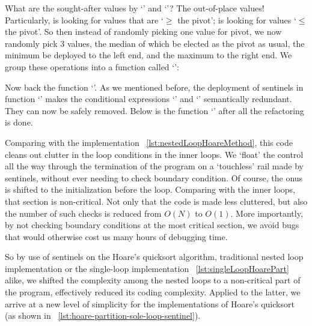 What are the sought-after values by `' and `'?
The out-of-place values!
Particularly,  is looking for values that are `$\geq$ the pivot';
 is looking for values `$\leq$ the pivot'.
So then instead of randomly picking one value for pivot, we now randomly pick $3$ values, the median
of which be elected as the pivot as usual, the minimum be deployed to the left end, and the maximum
to the right end.
We group these operations into a function called `':



Now back the function `'.
As we mentioned before, the deployment of sentinels in function `' makes
the conditional expressions `' and `' semantically redundant.
They can now be safely removed.
Below is the function `' after all the refactoring is done.

Comparing with the implementation ~\autoref{lst:nestedLoopHoareMethod}, this code
cleans out clutter in the loop conditions in the inner loops.
We `float' the control all the way through the termination of the program on a `touchless' rail made
by sentinels, without ever needing to check boundary condition.
Of course, the onus is shifted to the initialization before the loop.
Comparing with the inner loops, that section is non-critical.
Not only that the code is made less cluttered, but also the number of such checks
is reduced from $O(N)$ to $O(1)$.
More importantly, by not checking boundary conditions at the most critical section,
we avoid bugs that would otherwise cost us many hours of debugging time.


So by use of sentinels on the Hoare's quicksort algorithm, traditional nested loop implementation
or the single-loop implementation ~\autoref{lst:singleLoopHoarePart} alike,
we shifted the complexity among the nested loops to a non-critical part of the program,
effectively reduced its coding complexity.
Applied to the latter, we arrive at a new level of simplicity for the
implementations of Hoare's quicksort (as shown in ~\autoref{lst:hoare-partition-sole-loop-sentinel}).
